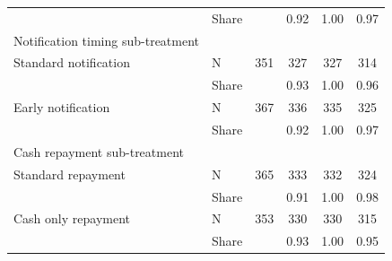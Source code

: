 \begin{tabular}{ll cc cc}
 & Share & & 0.92     & 1.00     & 0.97     \\
\hspace{1em} Notification timing sub-treatment & & & & & \\ 
\hspace{2em} Standard notification & N & 351      & 327      & 327      & 314      \\ 
 & Share &  & 0.93     & 1.00     & 0.96     \\ 
\hspace{2em} Early notification & N & 367      & 336      & 335      & 325      \\ 
 & Share &  & 0.92     & 1.00     & 0.97     \\ 
\hspace{1em} Cash repayment sub-treatment & & & & & \\ 
\hspace{2em} Standard repayment & N & 365      & 333      & 332      & 324      \\ 
 & Share &  & 0.91     & 1.00     & 0.98     \\ 
\hspace{2em} Cash only repayment & N & 353      & 330      & 330      & 315      \\ 
 & Share &  & 0.93     & 1.00     & 0.95     \\ 
\hline
\end{tabular}

